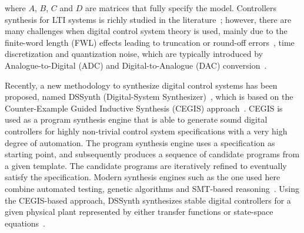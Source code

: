\documentclass[10pt,conference]{IEEEtran}
\begin{document}
\noindent where $A$, $B$, $C$ and $D$ are matrices that fully specify the model. 
%
Controllers synthesis for LTI systems is richly studied 
in the literature~\cite{mazo2010pessoa,DBLP:conf/emsoft/RavanbakhshS16,economakos2016automated}; 
however, there are many challenges when 
digital control system theory is used, mainly due to the finite-word 
length (FWL) effects leading to truncation 
or round-off errors~\cite{Guang2013, Istepanian2001}, time discretization 
and quantization noise, which are typically introduced by Analogue-to-Digital 
(ADC) and Digital-to-Analogue (DAC) conversion~\cite{astrom1997computer}. 

Recently, a new methodology to synthesize digital control systems has been proposed, 
named DSSynth (Digital-System Synthesizer)~\cite{abate2017, abatecav2017}, 
which is based on the Counter-Example Guided Inductive Synthesis 
(CEGIS) approach~\cite{DBLP:conf/asplos/Solar-LezamaTBSS06}. CEGIS is used
as a program synthesis engine that is able to generate sound digital controllers for highly non-trivial 
control system specifications with a very high degree of automation. The program synthesis engine 
uses a specification as starting point, and subsequently produces a sequence of candidate 
programs from a given template. The candidate programs are iteratively refined to eventually 
satisfy the specification. Modern synthesis engines such as the one used here combine automated testing, genetic algorithms 
and SMT-based reasoning~\cite{DBLP:journals/corr/AlurFSS16a, DBLP:conf/lpar/DavidKL15}. 
Using the CEGIS-based approach, DSSynth synthesizes stable digital controllers
for a given physical plant represented by either transfer functions or state-space equations~\cite{abate2017,abatecav2017}.
\end{document}
